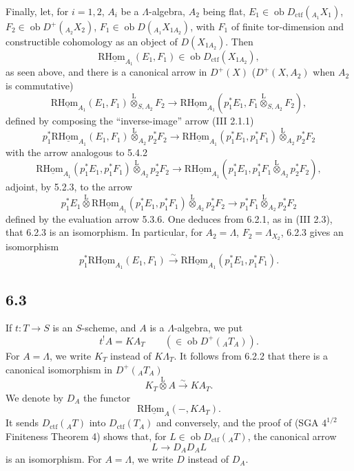 \documentclass[11pt]{article}
\providecommand{\lten}{\overset{\mathrm L}{\otimes}}
\providecommand{\Ob}{\operatorname{ob}}
\providecommand{\lten}{\overset{\mathrm L}{\otimes}}
\providecommand{\lten}{\overset{\mathrm L}{\otimes}}
\providecommand{\Ob}{\operatorname{ob}}
\providecommand{\lten}{\overset{\mathrm L}{\otimes}}
\providecommand{\lten}{\overset{\mathrm L}{\otimes}}
\providecommand{\Ob}{\operatorname{Ob}}
\providecommand{\lten}{\overset{\mathrm L}{\otimes}}
\providecommand{\Ob}{\operatorname{ob}}
\providecommand{\Ob}{\operatorname{Ob}}
\providecommand{\lten}{\overset{\mathrm L}{\otimes}}
\begin{document}
Finally, let, for $i=1,2$, $A_i$ be a $\Lambda$-algebra, $A_2$ being flat, $E_1\in\Ob D_{\mathrm{ctf}}({}_{A_1}X_1)$, $F_2\in\Ob D^+({}_{A_2}X_2)$, $F_1\in\Ob D({}_{A_1}X_{1A_2})$, with $F_1$ of finite tor-dimension and constructible cohomology as an object of $D(X_{1A_2})$. Then
\[
\mathrm{R}\underline{\mathrm{Hom}}_{A_1}(E_1,F_1)\in\Ob D_{\mathrm{ctf}}(X_{1A_2}),
\]
as seen above, and there is a canonical arrow in $D^+(X)$ ($D^+(X,A_2)$ when $A_2$ is commutative)
\begin{equation}
\mathrm{R}\underline{\mathrm{Hom}}_{A_1}(E_1,F_1)\lten_{S,A_2}F_2
\longrightarrow
\mathrm{R}\underline{\mathrm{Hom}}_{A_1}(p_1^*E_1,F_1\lten_{S,A_2}F_2),
\tag{6.2.3}
\end{equation}
defined by composing the “inverse-image” arrow (III 2.1.1)
\[
p_1^*\mathrm{R}\underline{\mathrm{Hom}}_{A_1}(E_1,F_1)\lten_{A_2}p_2^*F_2
\longrightarrow
\mathrm{R}\underline{\mathrm{Hom}}_{A_1}(p_1^*E_1,p_1^*F_1)\lten_{A_2}p_2^*F_2
\]
with the arrow analogous to 5.4.2
\[
\mathrm{R}\underline{\mathrm{Hom}}_{A_1}(p_1^*E_1,p_1^*F_1)\lten_{A_2}p_2^*F_2
\longrightarrow
\mathrm{R}\underline{\mathrm{Hom}}_{A_1}(p_1^*E_1,p_1^*F_1\lten_{A_2}p_2^*F_2),
\]
adjoint, by 5.2.3, to the arrow
\[
p_1^*E_1\lten\mathrm{R}\underline{\mathrm{Hom}}_{A_1}(p_1^*E_1,p_1^*F_1)\lten_{A_2}p_2^*F_2
\longrightarrow
p_1^*F_1\lten_{A_2}p_2^*F_2
\]
defined by the evaluation arrow 5.3.6. One deduces from 6.2.1, as in (III 2.3), that 6.2.3 is an isomorphism. In particular, for $A_2=\Lambda$, $F_2=\Lambda_{X_2}$, 6.2.3 gives an isomorphism
\begin{equation}
p_1^*\mathrm{R}\underline{\mathrm{Hom}}_{A_1}(E_1,F_1)
\xrightarrow{\sim}
\mathrm{R}\underline{\mathrm{Hom}}_{A_1}(p_1^*E_1,p_1^*F_1).
\tag{6.2.4}
\end{equation}

\subsection*{6.3}
If $t:T\to S$ is an $S$-scheme, and $A$ is a $\Lambda$-algebra, we put
\begin{equation}
t^!A = KA_T \qquad(\in\Ob D^+({}_AT_A)).
\tag{6.3.1}
\end{equation}
For $A=\Lambda$, we write $K_T$ instead of $K\Lambda_T$. It follows from 6.2.2 that there is a canonical isomorphism in $D^+({}_AT_A)$
\begin{equation}
K_T\lten A\xrightarrow{\sim}KA_T.
\tag{6.3.2}
\end{equation}
We denote by $D_A$ the functor
\[
\mathrm{R}\underline{\mathrm{Hom}}_A(-,KA_T).
\]
It sends $D_{\mathrm{ctf}}({}_AT)$ into $D_{\mathrm{ctf}}(T_A)$ and conversely, and the proof of (SGA $4^{1/2}$ Finiteness Theorem 4) shows that, for $L\in\Ob D_{\mathrm{ctf}}({}_AT)$, the canonical arrow
\[
L\longrightarrow D_AD_AL
\]
is an isomorphism. For $A=\Lambda$, we write $D$ instead of $D_A$.
\end{document}
